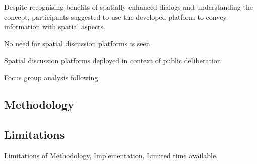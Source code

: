 Despite recognising benefits of spatially enhanced dialogs and understanding the concept, participants suggested to use the developed platform to convey information with spatial aspects.



No need for spatial discussion platforms is seen.



Spatial discussion platforms deployed in context of public deliberation




Focus group analysis following \cite{asbury1995overview}

\subsection{Methodology}
\label{sub:method-discussion}

\subsection{Limitations}
\label{sub:limitations}

Limitations of Methodology, Implementation, Limited time available.


